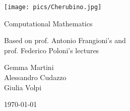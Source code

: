 \documentclass[preview,12pt]{article}
\begin{document}
\begin{titlepage}
\begin{center}
\vspace{3cm}

\Large

\vspace{2cm}

\texttt{[image: pics/Cherubino.jpg]}

\vspace{2.5cm}

{\Huge \sc Computational Mathematics}

\vspace{2cm}
Based on prof. Antonio Frangioni's and\\
  prof. Federico Poloni's lectures

\vspace{2cm}
Gemma Martini\\ Alessandro Cudazzo\\ Giulia Volpi
\vfill

\today

\end{center}
\end{titlepage}

\shipout\null
\newpage


\newpage

\newpage

\end{document}
